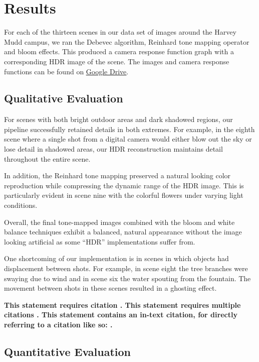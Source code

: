 \documentclass[
	a4paper, %
	10pt, %
	unnumberedsections, %
	twoside, %
]{LTJournalArticle}
\begin{document}
\section{Results}
For each of the thirteen scenes in our data set of images around the Harvey Mudd campus, we ran the Debevec algorithm, Reinhard tone mapping operator and bloom effects. This produced a camera response function graph with a corresponding HDR image of the scene. The images and camera response functions can be found on \underline{\textcolor{blue}{\href{https://drive.google.com/drive/folders/1Jsv7LVcdsvOUPuSliDZ4YODO_5oRG9gu?usp=share_link}{Google Drive}}}.

\subsection{Qualitative Evaluation}
For scenes with both bright outdoor areas and dark shadowed regions, our pipeline successfully retained details in both extremes. For example, in the eighth scene where a single shot from a digital camera would either blow out the sky or lose detail in shadowed areas, our HDR reconstruction maintains detail throughout the entire scene.

In addition, the Reinhard tone mapping preserved a natural looking color reproduction while compressing the dynamic range of the HDR image. This is particularly evident in scene nine with the colorful flowers under varying light conditions.

Overall, the final tone-mapped images combined with the bloom and white balance techniques exhibit a balanced, natural appearance without the image looking artificial as some “HDR” implementations suffer from.

One shortcoming of our implementation is in scenes in which objects had displacement between shots. For example, in scene eight the tree branches were swaying due to wind and in scene six the water spouting from the fountain. The movement between shots in these scenes resulted in a ghosting effect.


\textbf{This statement requires citation \autocite{Smith:2023qr}. This statement requires multiple citations \autocite{Smith:2023qr, Smith:2024jd}. This statement contains an in-text citation, for directly referring to a citation like so: \textcite{Smith:2024jd}.}

\subsection{Quantitative Evaluation}
\end{document}
